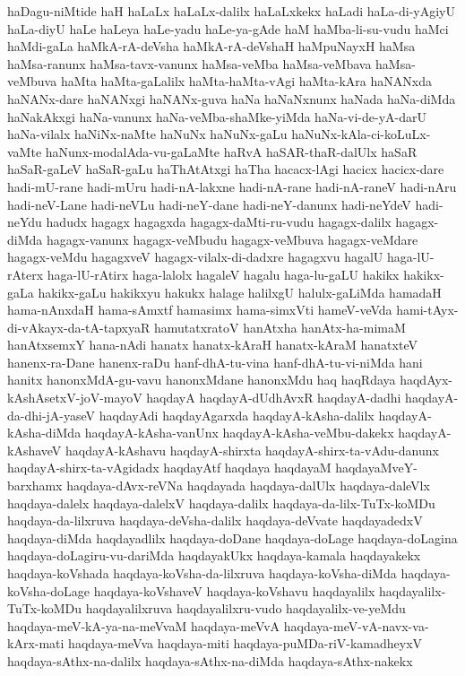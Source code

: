 {haDagu-niMtide
haH
haLaLx
haLaLx-dalilx
haLaLxkekx
haLadi
haLa-di-yAgiyU
haLa-diyU
haLe
haLeya
haLe-yadu
haLe-ya-gAde
haM
haMba-li-su-vudu
haMci
haMdi-gaLa
haMkA-rA-deVsha
haMkA-rA-deVshaH
haMpuNayxH
haMsa
haMsa-ranunx
haMsa-tavx-vanunx
haMsa-veMba
haMsa-veMbava
haMsa-veMbuva
haMta
haMta-gaLalilx
haMta-haMta-vAgi
haMta-kAra
haNANxda
haNANx-dare
haNANxgi
haNANx-guva
haNa
haNaNxnunx
haNada
haNa-diMda
haNakAkxgi
haNa-vanunx
haNa-veMba-shaMke-yiMda
haNa-vi-de-yA-darU
haNa-vilalx
haNiNx-naMte
haNuNx
haNuNx-gaLu
haNuNx-kAla-ci-koLuLx-vaMte
haNunx-modalAda-vu-gaLaMte
haRvA
haSAR-thaR-dalUlx
haSaR
haSaR-gaLeV
haSaR-gaLu
haThAtAtxgi
haTha
hacacx-lAgi
hacicx
hacicx-dare
hadi-mU-rane
hadi-mUru
hadi-nA-lakxne
hadi-nA-rane
hadi-nA-raneV
hadi-nAru
hadi-neV-Lane
hadi-neVLu
hadi-neY-dane
hadi-neY-danunx
hadi-neYdeV
hadi-neYdu
hadudx
hagagx
hagagxda
hagagx-daMti-ru-vudu
hagagx-dalilx
hagagx-diMda
hagagx-vanunx
hagagx-veMbudu
hagagx-veMbuva
hagagx-veMdare
hagagx-veMdu
hagagxveV
hagagx-vilalx-di-dadxre
hagagxvu
hagalU
haga-lU-rAterx
haga-lU-rAtirx
haga-lalolx
hagaleV
hagalu
haga-lu-gaLU
hakikx
hakikx-gaLa
hakikx-gaLu
hakikxyu
hakukx
halage
halilxgU
halulx-gaLiMda
hamadaH
hama-nAnxdaH
hama-sAmxtf
hamasimx
hama-simxVti
hameV-veVda
hami-tAyx-di-vAkayx-da-tA-tapxyaR
hamutatxratoV
hanAtxha
hanAtx-ha-mimaM
hanAtxsemxY
hana-nAdi
hanatx
hanatx-kAraH
hanatx-kAraM
hanatxteV
hanenx-ra-Dane
hanenx-raDu
hanf-dhA-tu-vina
hanf-dhA-tu-vi-niMda
hani
hanitx
hanonxMdA-gu-vavu
hanonxMdane
hanonxMdu
haq
haqRdaya
haqdAyx-kAshAsetxV-joV-mayoV
haqdayA
haqdayA-dUdhAvxR
haqdayA-dadhi
haqdayA-da-dhi-jA-yaseV
haqdayAdi
haqdayAgarxda
haqdayA-kAsha-dalilx
haqdayA-kAsha-diMda
haqdayA-kAsha-vanUnx
haqdayA-kAsha-veMbu-dakekx
haqdayA-kAshaveV
haqdayA-kAshavu
haqdayA-shirxta
haqdayA-shirx-ta-vAdu-danunx
haqdayA-shirx-ta-vAgidadx
haqdayAtf
haqdaya
haqdayaM
haqdayaMveY-barxhamx
haqdaya-dAvx-reVNa
haqdayada
haqdaya-dalUlx
haqdaya-daleVlx
haqdaya-dalelx
haqdaya-dalelxV
haqdaya-dalilx
haqdaya-da-lilx-TuTx-koMDu
haqdaya-da-lilxruva
haqdaya-deVsha-dalilx
haqdaya-deVvate
haqdayadedxV
haqdaya-diMda
haqdayadlilx
haqdaya-doDane
haqdaya-doLage
haqdaya-doLagina
haqdaya-doLagiru-vu-dariMda
haqdayakUkx
haqdaya-kamala
haqdayakekx
haqdaya-koVshada
haqdaya-koVsha-da-lilxruva
haqdaya-koVsha-diMda
haqdaya-koVsha-doLage
haqdaya-koVshaveV
haqdaya-koVshavu
haqdayalilx
haqdayalilx-TuTx-koMDu
haqdayalilxruva
haqdayalilxru-vudo
haqdayalilx-ve-yeMdu
haqdaya-meV-kA-ya-na-meVvaM
haqdaya-meVvA
haqdaya-meV-vA-navx-va-kArx-mati
haqdaya-meVva
haqdaya-miti
haqdaya-puMDa-riV-kamadheyxV
haqdaya-sAthx-na-dalilx
haqdaya-sAthx-na-diMda
haqdaya-sAthx-nakekx
}
